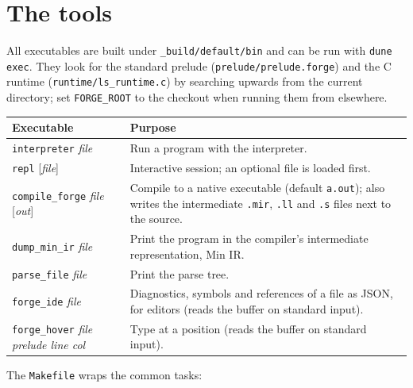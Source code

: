 \section{The tools}

All executables are built under \texttt{\_build/default/bin} and can be run
with \texttt{dune exec}. They look for the standard prelude
(\texttt{prelude/prelude.forge}) and the C runtime
(\texttt{runtime/ls\_runtime.c}) by searching upwards from the current
directory; set \texttt{FORGE\_ROOT} to the checkout when running them from
elsewhere.

\begin{center}
\small
\begin{tabularx}{\textwidth}{@{}l X@{}}
\toprule
\textbf{Executable} & \textbf{Purpose} \\
\midrule
\texttt{interpreter} \textit{file} & Run a program with the interpreter.\index{interpreter} \\
\texttt{repl} [\textit{file}] & Interactive session; an optional file is loaded first.\index{REPL} \\
\texttt{compile\_forge} \textit{file} [\textit{out}] & Compile to a native executable (default \texttt{a.out}); also writes the intermediate \texttt{.mir}, \texttt{.ll} and \texttt{.s} files next to the source.\index{native compiler} \\
\texttt{dump\_min\_ir} \textit{file} & Print the program in the compiler's intermediate representation, Min IR. \\
\texttt{parse\_file} \textit{file} & Print the parse tree. \\
\texttt{forge\_ide} \textit{file} & Diagnostics, symbols and references of a file as JSON, for editors (reads the buffer on standard input). \\
\texttt{forge\_hover} \textit{file prelude line col} & Type at a position (reads the buffer on standard input). \\
\bottomrule
\end{tabularx}
\end{center}

The \texttt{Makefile} wraps the common tasks:

